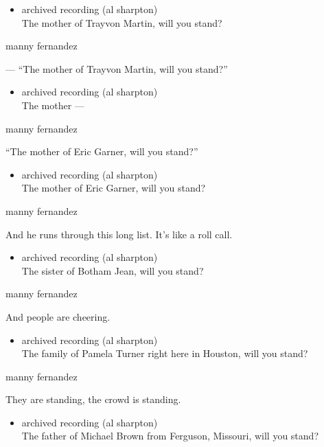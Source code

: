 \begin{itemize}
\tightlist
\item
  archived recording (al sharpton)\\
  The mother of Trayvon Martin, will you stand?
\end{itemize}

manny fernandez

--- ``The mother of Trayvon Martin, will you stand?''

\begin{itemize}
\tightlist
\item
  archived recording (al sharpton)\\
  The mother ---
\end{itemize}

manny fernandez

``The mother of Eric Garner, will you stand?''

\begin{itemize}
\tightlist
\item
  archived recording (al sharpton)\\
  The mother of Eric Garner, will you stand?
\end{itemize}

manny fernandez

And he runs through this long list. It's like a roll call.

\begin{itemize}
\tightlist
\item
  archived recording (al sharpton)\\
  The sister of Botham Jean, will you stand?
\end{itemize}

manny fernandez

And people are cheering.

\begin{itemize}
\tightlist
\item
  archived recording (al sharpton)\\
  The family of Pamela Turner right here in Houston, will you stand?
\end{itemize}

manny fernandez

They are standing, the crowd is standing.

\begin{itemize}
\tightlist
\item
  archived recording (al sharpton)\\
  The father of Michael Brown from Ferguson, Missouri, will you stand?
\end{itemize}

